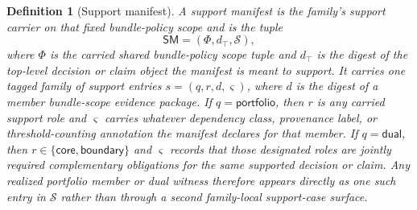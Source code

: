 \documentclass[11pt]{article}
\newtheorem{definition}{Definition}
\begin{document}
\begin{definition}[Support manifest]
A support manifest is the family's support carrier on that fixed bundle-policy scope and is the tuple
\[
\mathsf{SM}=(\Phi,d_{\top},\mathcal{S}),
\]
where $\Phi$ is the carried shared bundle-policy scope tuple and $d_{\top}$ is the digest of the top-level decision or claim object the manifest is meant to support.
It carries one tagged family of support entries $s=(q,r,d,\varsigma)$, where $d$ is the digest of a member bundle-scope evidence package. If $q=\mathsf{portfolio}$, then $r$ is any carried support role and $\varsigma$ carries whatever dependency class, provenance label, or threshold-counting annotation the manifest declares for that member. If $q=\mathsf{dual}$, then $r\in\{\textsf{core},\textsf{boundary}\}$ and $\varsigma$ records that those designated roles are jointly required complementary obligations for the same supported decision or claim. Any realized portfolio member or dual witness therefore appears directly as one such entry in $\mathcal{S}$ rather than through a second family-local support-case surface.
\end{definition}
\end{document}
